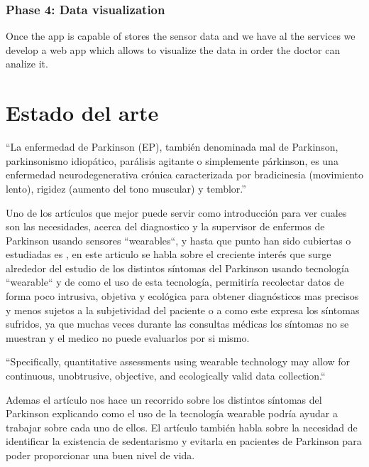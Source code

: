 \documentclass[11pt,spanish]{article}
\begin{document}
\subsubsection{Phase 4: Data visualization}

Once the app is capable of stores the sensor data and we have al the services we develop a web app which allows to visualize the data in order the doctor can analize it.
\newpage

\section{Estado del arte}

“La enfermedad de Parkinson (EP), también denominada mal de Parkinson, parkinsonismo idiopático, parálisis agitante o simplemente párkinson, es una enfermedad neurodegenerativa crónica caracterizada por bradicinesia (movimiento lento), rigidez (aumento del tono muscular) y temblor.” \cite{Wikipedia} 
\newline

Uno de los artículos que mejor puede servir como introducción para ver cuales son las necesidades, acerca del diagnostico y la supervisor de enfermos de Parkinson usando sensores ``wearables``, y hasta que punto han sido cubiertas o estudiadas es \cite{resumen2}, en este articulo se habla sobre el creciente interés que surge alrededor del estudio de los distintos síntomas del Parkinson usando tecnología ``wearable`` y de como el uso de esta tecnología, permitiría recolectar datos de forma poco intrusiva, objetiva y ecológica para obtener diagnósticos mas precisos y menos sujetos a la subjetividad del paciente o a como este expresa los síntomas sufridos, ya que muchas veces durante las consultas médicas los síntomas no se muestran y el medico no puede evaluarlos por si mismo.
\newline

``Specifically, quantitative assessments using wearable technology may allow for continuous, unobtrusive, objective, and ecologically valid data collection.``
\newline

Ademas el artículo nos hace un recorrido sobre los distintos síntomas del Parkinson explicando como el uso de la tecnología wearable podría ayudar a trabajar sobre cada uno de ellos. El artículo también habla sobre la necesidad de identificar la existencia de sedentarismo y evitarla en pacientes de Parkinson para poder proporcionar una buen nivel de vida.
\newline
\end{document}
